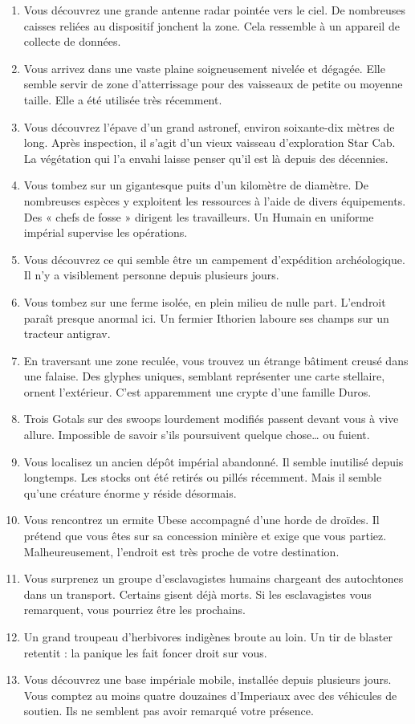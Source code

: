 \documentclass{article}
\begin{document}
\begin{enumerate}
	\item Vous découvrez une grande antenne radar pointée vers le ciel. De nombreuses caisses reliées au dispositif jonchent la zone. Cela ressemble à un appareil de collecte de données.
	\item Vous arrivez dans une vaste plaine soigneusement nivelée et dégagée. Elle semble servir de zone d’atterrissage pour des vaisseaux de petite ou moyenne taille. Elle a été utilisée très récemment.
	\item Vous découvrez l’épave d’un grand astronef, environ soixante-dix mètres de long. Après inspection, il s’agit d’un vieux vaisseau d’exploration Star Cab. La végétation qui l’a envahi laisse penser qu’il est là depuis des décennies.
	\item Vous tombez sur un gigantesque puits d’un kilomètre de diamètre. De nombreuses espèces y exploitent les ressources à l’aide de divers équipements. Des « chefs de fosse » dirigent les travailleurs. Un Humain en uniforme impérial supervise les opérations.
	\item Vous découvrez ce qui semble être un campement d’expédition archéologique. Il n’y a visiblement personne depuis plusieurs jours.
	\item Vous tombez sur une ferme isolée, en plein milieu de nulle part. L’endroit paraît presque anormal ici. Un fermier Ithorien laboure ses champs sur un tracteur antigrav.
	\item En traversant une zone reculée, vous trouvez un étrange bâtiment creusé dans une falaise. Des glyphes uniques, semblant représenter une carte stellaire, ornent l’extérieur. C’est apparemment une crypte d’une famille Duros.
	\item Trois Gotals sur des swoops lourdement modifiés passent devant vous à vive allure. Impossible de savoir s’ils poursuivent quelque chose… ou fuient.
	\item Vous localisez un ancien dépôt impérial abandonné. Il semble inutilisé depuis longtemps. Les stocks ont été retirés ou pillés récemment. Mais il semble qu’une créature énorme y réside désormais.
	\item Vous rencontrez un ermite Ubese accompagné d’une horde de droïdes. Il prétend que vous êtes sur sa concession minière et exige que vous partiez. Malheureusement, l’endroit est très proche de votre destination.
	\item Vous surprenez un groupe d’esclavagistes humains chargeant des autochtones dans un transport. Certains gisent déjà morts. Si les esclavagistes vous remarquent, vous pourriez être les prochains.
	\item Un grand troupeau d’herbivores indigènes broute au loin. Un tir de blaster retentit : la panique les fait foncer droit sur vous.
	\item Vous découvrez une base impériale mobile, installée depuis plusieurs jours. Vous comptez au moins quatre douzaines d’Imperiaux avec des véhicules de soutien. Ils ne semblent pas avoir remarqué votre présence.
\end{enumerate}
\end{document}
